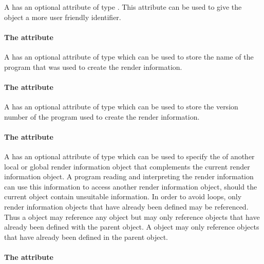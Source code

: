 A \RenderInformationBase has an optional attribute  of type
. This  attribute can be used to give the object a 
more user friendly identifier.

\paragraph{The \fixttspace{} attribute}

A \RenderInformationBase has an optional attribute 
of type  which can be used to store the name of the program 
that was used to create the render information.

\paragraph{The \fixttspace{} attribute}

A \RenderInformationBase has an optional attribute
 of type  which can be used to store 
the version number of the program used to create the render information.

\paragraph{The \fixttspace{} attribute}

A \RenderInformationBase has an optional attribute
 of type  which can be used to 
specify the  of another local or global render information object 
that complements the current render information object. A program reading and 
interpreting the render information can use this information to access another 
render information object, should the current object contain unsuitable information. 
In order to avoid loops, only render information objects that have already been 
defined may be referenced. Thus a \LocalRenderInformation object may reference any 
\GlobalRenderInformation object but may only reference \LocalRenderInformation objects 
that have already been defined with the parent  object. 
A \GlobalRenderInformation object may only reference \GlobalRenderInformation objects 
that have already been defined in the parent  object.


\paragraph{The \fixttspace{} attribute}

